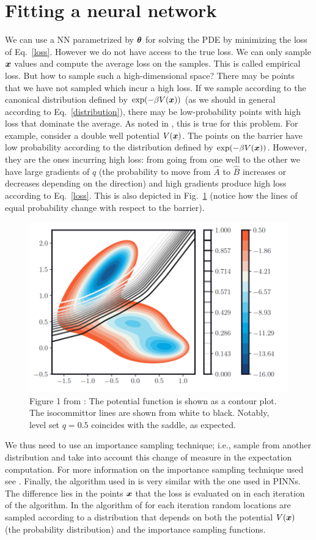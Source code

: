 \section{Fitting a neural network}
We can use a NN parametrized by $\boldsymbol{\theta}$ for solving the PDE by minimizing the loss of Eq.~\eqref{loss}. 
However we do not have access to the true loss. 
We can only sample $\boldsymbol{x}$ values and compute the average loss on the samples. 
This is called empirical loss. 
But how to sample such a high-dimensional space? 
There may be points that we have not sampled which incur a high loss. 
If we sample according to the canonical distribution defined by $\exp(-\beta V(\boldsymbol{x}))$ (as we should in general according to Eq.~\eqref{distribution}), there may be low-probability points with high loss that dominate the average. 
As noted in \textcite{rotskoff2020learning}, this is true for this problem. 
For example, consider a double well potential $V(\boldsymbol{x})$. 
The points on the barrier have low probability according to the distribution defined by $\exp(-\beta V(\boldsymbol{x}))$. 
However, they are the ones incurring high loss: from going from one well to the other we have large gradients of $q$ (the probability to move from $\hat{A}$ to $\hat{B}$ increases or decreases depending on the direction) and high gradients produce high loss according to Eq.~\eqref{loss}. 
This is also depicted in Fig.~\ref{potential} (notice how the lines of equal probability change with respect to the barrier).
\begin{figure}[H]
	\centering
	\includegraphics[width=0.7\linewidth]{./Figures/potential.png}
	\caption{Figure 1 from \textcite{rotskoff2020learning}: The potential function is shown as a contour plot. The isocommittor lines are shown from white to black. Notably, level set $q = 0.5$ coincides with the saddle, as expected.}
	\label{potential}
\end{figure}

We thus need to use an importance sampling technique; i.e., sample from another distribution and take into account this change of measure in the expectation computation. 
For more information on the importance sampling technique used see \textcite{thiede2016eigenvector}. 
Finally, the algorithm used in \textcite{rotskoff2020learning} is very similar with the one used in PINNs.
The difference lies in the points $\boldsymbol{x}$ that the loss is evaluated on in each iteration of the algorithm. 
In the algorithm of \textcite{thiede2016eigenvector} for each iteration random locations are sampled according to a distribution that depends on both the potential $V(\boldsymbol{x})$ (the probability distribution) and the importance sampling functions.

